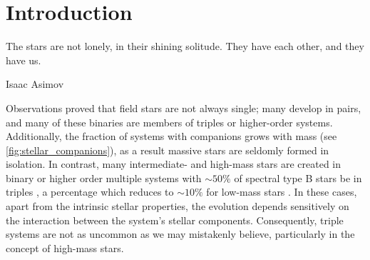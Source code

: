 \chapter{Introduction} \label{introduction}

\epigraph{The stars are not lonely, in their shining solitude. They have each other, and they have us.}{Isaac Asimov}


Observations proved that field stars are not always single; many develop in pairs, and many of these binaries are members of triples or higher-order systems. Additionally, the fraction of systems with companions grows with mass (see \cref{fig:stellar_companions}), as a result massive stars are seldomly formed in isolation. In contrast, many intermediate- and high-mass stars are created in binary or higher order multiple systems with $\sim 50\%$ of spectral type B stars be in triples \citep{sana2014southern,moe2017mind}, a percentage which reduces to $\sim 10\%$ for low-mass stars \citep{raghavan2010survey,toonen2014popcorn,moe2017mind}. In these cases, apart from the intrinsic stellar properties, the evolution depends sensitively on the interaction between the system's stellar components. Consequently, triple systems are not as uncommon as we may mistakenly believe, particularly in the concept of high-mass stars.

